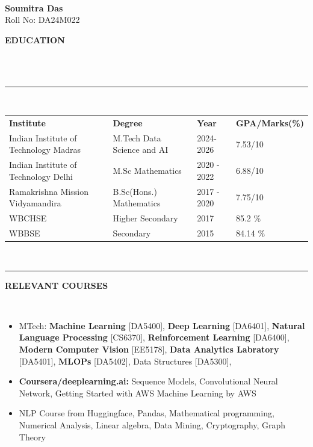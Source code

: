 \documentclass[a4paper,10pt]{article}
\newcommand\tab[1][0.5cm]{\hspace*{#1}}
\newcommand{\lsep}{-0.5cm}
\newcommand{\resheading}[1]{{\small \colorbox{mygrey}{\begin{minipage}{0.975\textwidth}{\textbf{#1 \vphantom{p\^{E}}}}\end{minipage}}}}
\begin{document}
\hspace{0.5cm}\\[-0.2cm]
\begin{center}

    \textbf{\huge Soumitra Das} \\
    Roll No: DA24M022

\end{center}

\resheading{\textbf{EDUCATION} }\\[\lsep]
\\
\indent \rule{6.8in}{0.4pt}\\
\indent \begin{tabular}{ l @{\hskip 0.15in} l @{\hskip 0.15in} l @{\hskip 0.15in} l @{\hskip 0.15in} }
\noindent \textbf{Institute} & \textbf{Degree} & \textbf{Year} & \textbf{GPA/Marks(\%)}\\
Indian Institute of Technology Madras & M.Tech Data Science and AI & 2024-2026 & 7.53/10\\
Indian Institute of Technology Delhi & M.Sc Mathematics & 2020 - 2022 & 6.88/10\\
Ramakrishna Mission Vidyamandira & B.Sc(Hons.) Mathematics & 2017 - 2020 & 7.75/10\\
WBCHSE & Higher Secondary & 2017 & 85.2 \% \\
WBBSE & Secondary & 2015 & 84.14 \% \\

\end{tabular}
\\
\indent \rule{6.8in}{0.4pt}

\resheading{\textbf{RELEVANT COURSES} }\\[\lsep]
\begin{itemize}
\setlength\itemsep{0.02em}

\item MTech: \textbf{Machine Learning} [DA5400], \textbf{Deep Learning} [DA6401], \textbf{Natural Language Processing} [CS6370], \textbf{Reinforcement Learning} [DA6400], \textbf{Modern Computer Vision} [EE5178], \textbf{Data Analytics Labratory} [DA5401], \textbf{MLOPs} [DA5402], Data Structures [DA5300], 

\item \textbf{Coursera/deeplearning.ai: } Sequence Models, Convolutional Neural Network, Getting Started with AWS Machine Learning by AWS 

\item NLP Course from Huggingface, Pandas, Mathematical programming, Numerical Analysis, Linear algebra, Data Mining, Cryptography, Graph Theory
\end{itemize}
\end{document}
